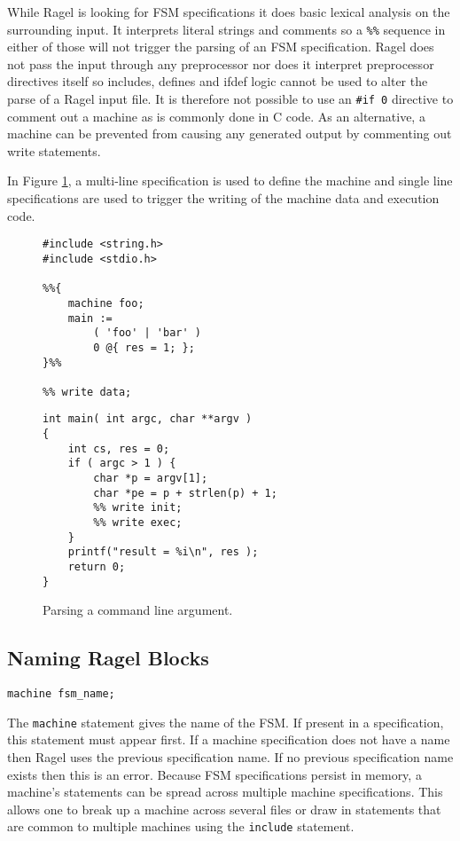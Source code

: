 \documentclass[letterpaper,11pt,oneside]{book}
\newcommand{\verbspace}{\vspace{10pt}}
\begin{document}
While Ragel is looking for FSM specifications it does basic lexical analysis on
the surrounding input. It interprets literal strings and comments so a
\verb|%%| sequence in either of those will not trigger the parsing of an FSM
specification. Ragel does not pass the input through any preprocessor nor does it
interpret preprocessor directives itself so includes, defines and ifdef logic
cannot be used to alter the parse of a Ragel input file. It is therefore not
possible to use an \verb|#if 0| directive to comment out a machine as is
commonly done in C code. As an alternative, a machine can be prevented from
causing any generated output by commenting out write statements.

In Figure \ref{cmd-line-parsing}, a multi-line specification is used to define the
machine and single line specifications are used to trigger the writing of the machine
data and execution code.

\begin{figure}
\small
\begin{multicols}{2}
\begin{verbatim}
#include <string.h>
#include <stdio.h>

%%{ 
    machine foo;
    main := 
        ( 'foo' | 'bar' ) 
        0 @{ res = 1; };
}%%

%% write data;
\end{verbatim}
\verbspace
\columnbreak
\begin{verbatim}
int main( int argc, char **argv )
{
    int cs, res = 0;
    if ( argc > 1 ) {
        char *p = argv[1];
        char *pe = p + strlen(p) + 1;
    }
    printf("result = %
    return 0;
}
\end{verbatim}
\verbspace
\end{multicols}
\caption{Parsing a command line argument.
}
\label{cmd-line-parsing}
\end{figure}

\subsection{Naming Ragel Blocks}

\begin{verbatim}
machine fsm_name;
\end{verbatim}
\verbspace

The \verb|machine| statement gives the name of the FSM. If present in a
specification, this statement must appear first. If a machine specification
does not have a name then Ragel uses the previous specification name.  If no
previous specification name exists then this is an error. Because FSM
specifications persist in memory, a machine's statements can be spread across
multiple machine specifications.  This allows one to break up a machine across
several files or draw in statements that are common to multiple machines using
the \verb|include| statement.
\end{document}
